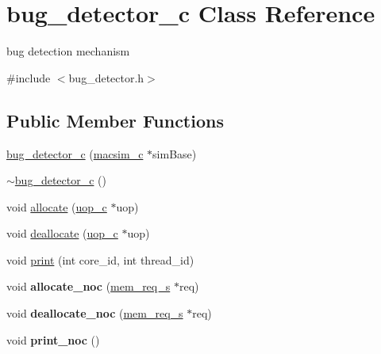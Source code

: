 \hypertarget{classbug__detector__c}{
\section{bug\_\-detector\_\-c Class Reference}
\label{classbug__detector__c}
}


bug detection mechanism  




{\ttfamily \#include $<$bug\_\-detector.h$>$}

\subsection*{Public Member Functions}
\begin{DoxyCompactItemize}
\item 
\hyperlink{classbug__detector__c_a3df8691c8540d84e124b21f963b63b85}{bug\_\-detector\_\-c} (\hyperlink{classmacsim__c}{macsim\_\-c} $\ast$simBase)
\item 
\hyperlink{classbug__detector__c_a099634a48c3bb831ba71e324c715ee07}{$\sim$bug\_\-detector\_\-c} ()
\item 
void \hyperlink{classbug__detector__c_a3437b86d0318c26d6400b6f4720a07a8}{allocate} (\hyperlink{classuop__c}{uop\_\-c} $\ast$uop)
\item 
void \hyperlink{classbug__detector__c_a85401b346bcc130a82efe527c86c93e0}{deallocate} (\hyperlink{classuop__c}{uop\_\-c} $\ast$uop)
\item 
void \hyperlink{classbug__detector__c_adb23aaa4e33a08f4dd92f0767cb17d39}{print} (int core\_\-id, int thread\_\-id)
\item 
\hypertarget{classbug__detector__c_aa51660c5a7b6deb7391480fbe74bbb3a}{
void {\bfseries allocate\_\-noc} (\hyperlink{structmem__req__s}{mem\_\-req\_\-s} $\ast$req)}
\label{classbug__detector__c_aa51660c5a7b6deb7391480fbe74bbb3a}

\item 
\hypertarget{classbug__detector__c_a6a65357fe5803b0a1a3bfb22ffbe1015}{
void {\bfseries deallocate\_\-noc} (\hyperlink{structmem__req__s}{mem\_\-req\_\-s} $\ast$req)}
\label{classbug__detector__c_a6a65357fe5803b0a1a3bfb22ffbe1015}

\item 
\hypertarget{classbug__detector__c_a556e83704342d2a8fc5fd600e0dd8df9}{
void {\bfseries print\_\-noc} ()}
\label{classbug__detector__c_a556e83704342d2a8fc5fd600e0dd8df9}

\end{DoxyCompactItemize}
